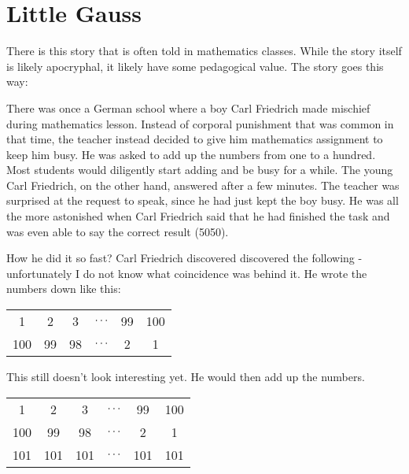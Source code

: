 \chapter{Little Gauss}
There is this story that is often told in mathematics classes. While the story itself is likely apocryphal, it likely have some pedagogical value. The story goes this way:

\vspace{5mm} %

\noindent There was once a German school where a boy Carl Friedrich made mischief during mathematics lesson. Instead of corporal punishment that was common in that time, the teacher instead decided to give him mathematics assignment to keep him busy. He was asked to add up the numbers from one to a hundred. Most students would diligently start adding and be busy for a while. The young Carl Friedrich, on the other hand, answered after a few minutes. The teacher was surprised at the request to speak, since he had just kept the boy busy. He was all the more astonished when Carl Friedrich said that he had finished the task and was even able to say the correct result (5050).

\vspace{5mm} %


\vspace{5mm} %

\noindent How he did it so fast? Carl Friedrich discovered discovered the following - unfortunately I do not know what coincidence was behind it. He wrote the numbers down like this:

\begin{center}
\begin{tabular}{cccccc}
1   & 2  & 3  & $\mathellipsis$ & 99 & 100 \\
100 & 99 & 98 & $\mathellipsis$ & 2  & 1  
\end{tabular}
\end{center}

\noindent This still doesn't look interesting yet. He would then add up the numbers.

\begin{center}
\begin{tabular}{cccccc}
1   & 2  & 3  & $\mathellipsis$ & 99 & 100 \\
100 & 99 & 98 & $\mathellipsis$ & 2  & 1  \\
101 & 101 & 101 & $\mathellipsis$ & 101 & 101
\end{tabular}
\end{center}

